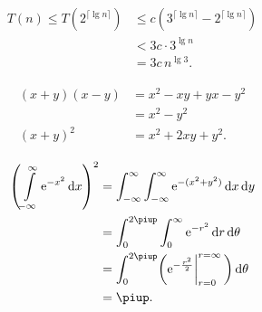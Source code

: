 
	\begin{align*}
	T(n)\le T(2^{\lceil\lg n\rceil})
	&\le c(3^{\lceil\lg n\rceil}-2^{\lceil\lg n\rceil})\\
	&<3c\cdot3^{\lg n}\\
	&=3c\,n^{\lg3}.
	\end{align*}



	\begin{align*}
	\begin{aligned}
	(x+y)(x-y)&=x^2-xy+yx-y^2\\
	&=x^2-y^2\\
	(x+y)^2&=x^2+2xy+y^2.
	\end{aligned}
	\end{align*}


	\begin{align*}
	\begin{aligned}
	\left( \int\limits_{-\infty}^\infty \mathup{e}^{-x^2}\,\mathup{d}x \right)^2
	&=\int_{-\infty}^\infty\int_{-\infty}^\infty \mathup{e}^{-(x^2+y^2)}\,\mathup{d}x\,\mathup{d}y\\
	&=\int_0^{2\piup}\int_0^\infty \mathup{e}^{-r^2}\,\mathup{d}r\,\mathup{d}\theta\\
	&=\int_0^{2\piup}\biggl(\mathup{e}^{-\frac{r^2}{2}}\biggl|_{r=0}^{r=\infty}\,\biggr)\,\mathup{d}\theta\\
	&=\piup.
	\end{aligned}
	\end{align*}

